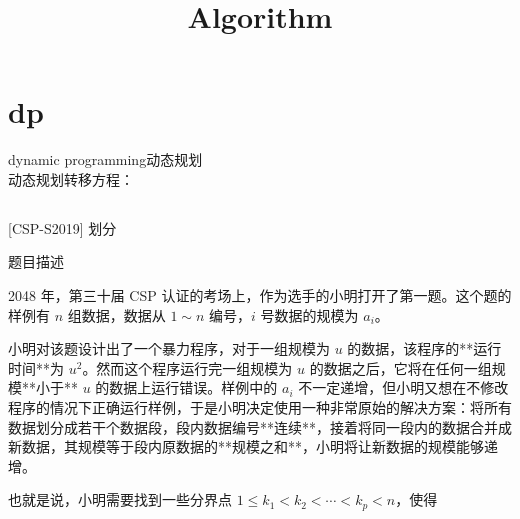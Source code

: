 \documentclass[12pt,twiside,a4paper]{ctexbook}
\numberwithin{chapter}{part}
\begin{document}
\title{Algorithm}
\maketitle
\tableofcontents %
\newpage
\pagestyle{fancy}


\chapter{dp}
dynamic programming动态规划\\
动态规划转移方程：

\section{}
 [CSP-S2019] 划分

 题目描述

2048 年，第三十届 CSP 认证的考场上，作为选手的小明打开了第一题。这个题的样例有 $n$ 组数据，数据从 $1 \sim n$ 编号，$i$ 号数据的规模为 $a_i$。

小明对该题设计出了一个暴力程序，对于一组规模为 $u$ 的数据，该程序的**运行时间**为 $u^2$。然而这个程序运行完一组规模为 $u$ 的数据之后，它将在任何一组规模**小于** $u$ 的数据上运行错误。样例中的 $a_i$ 不一定递增，但小明又想在不修改程序的情况下正确运行样例，于是小明决定使用一种非常原始的解决方案：将所有数据划分成若干个数据段，段内数据编号**连续**，接着将同一段内的数据合并成新数据，其规模等于段内原数据的**规模之和**，小明将让新数据的规模能够递增。

也就是说，小明需要找到一些分界点 $1 \leq k_1 < k_2 < \cdots < k_p < n$，使得
\end{document}
